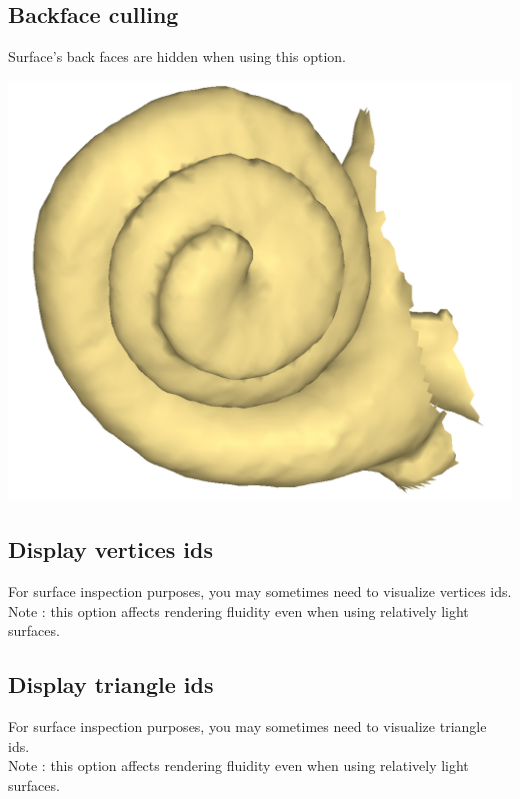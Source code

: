 \noindent
\begin{minipage}{0.55\textwidth}

\subsection{Backface culling}
Surface’s back faces are hidden when using this option.
\end{minipage}  
 \begin{minipage}{0.45\textwidth}\centering

\includegraphics[scale=0.1]{images/Viewing_options/Backface_culling.png}

 \end{minipage} 
\noindent




\subsection{Display vertices ids}
For surface inspection purposes, you may sometimes need to visualize vertices ids. Note : this option affects rendering fluidity even when using relatively light surfaces.

\subsection{Display triangle ids}
For surface inspection purposes, you may sometimes need to visualize triangle ids.\\
Note : this option affects rendering fluidity even when using relatively light surfaces.\\



